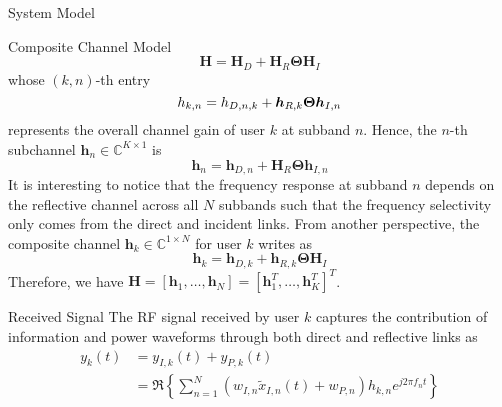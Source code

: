 \documentclass{IEEEtran}
\begin{document}
\begin{section} {System Model}
\begin{subsection}	{Composite Channel Model}
\begin{equation}
			\boldsymbol{H} = \boldsymbol{H}_D+\boldsymbol{H}_R\boldsymbol{\Theta}\boldsymbol{H}_I
		\end{equation}
		whose $(k,n)$-th entry
		\begin{equation}	\label{eq:h_{k,n}}
			h_{k,n}=h_{D,n,k}+\boldsymbol{h}_{R,k}\boldsymbol{\Theta}\boldsymbol{h}_{I,n}
		\end{equation}
		represents the overall channel gain of user $k$ at subband $n$. Hence, the $n$-th subchannel $\boldsymbol{h}_n \in \mathbb{C}^{K \times 1}$ is
		\begin{equation}	\label{eq:h_n}
			\boldsymbol{h}_n=\boldsymbol{h}_{D,n}+\boldsymbol{H}_{R}\boldsymbol{\Theta}\boldsymbol{h}_{I,n}
		\end{equation}
		It is interesting to notice that the frequency response at subband $n$ depends on the reflective channel across all $N$ subbands such that the frequency selectivity only comes from the direct and incident links. From another perspective, the composite channel $\boldsymbol{h}_k \in \mathbb{C}^{1 \times N}$ for user $k$ writes as
		\begin{equation}	\label{eq:h_k}
			\boldsymbol{h}_k=\boldsymbol{h}_{D,k}+\boldsymbol{h}_{R,k}\boldsymbol{\Theta}\boldsymbol{H}_I
		\end{equation}
		Therefore, we have $\boldsymbol{H}=[\boldsymbol{h}_1,\dots,\boldsymbol{h}_N]=[\boldsymbol{h}_1^T,\dots,\boldsymbol{h}_K^T]^T$.
	\end{subsection}

	\begin{subsection}	{Received Signal}
		The RF signal received by user $k$ captures the contribution of information and power waveforms through both direct and reflective links as
		\begin{equation}	\label{eq:y_k(t)}
			\begin{split}
				y_k(t)
				&=y_{I,k}(t)+y_{P,k}(t)	\\
				&=\Re\left\{{\sum_{n=1}^N{(w_{I,n}\tilde{x}_{I,n}(t)+w_{P,n})h_{k,n}e^{j2{\pi}{f_n}t}}}\right\}
			\end{split}
		\end{equation}

	\end{subsection}


\end{section}
\end{document}

